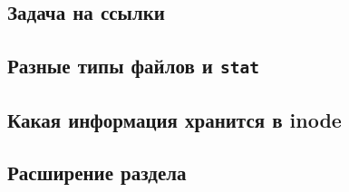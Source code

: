 \documentclass{article}
\begin{document}
\subsection{Задача на ссылки}

\subsection{Разные типы файлов и \texttt{stat}}


\subsection{Какая информация хранится в inode}

\subsection{Расширение раздела}



\iffalse
\newpage
~
\newpage

\subsection*{Идеи}
\begin{itemize}
\item Вопросы по ext2
\begin{itemize}
\item Сколько памяти может занимать 1 файл в ext2 (block=4kb, размер указателя = 4 или 8).
\end{itemize}
\end{itemize}


\fi
\end{document}
